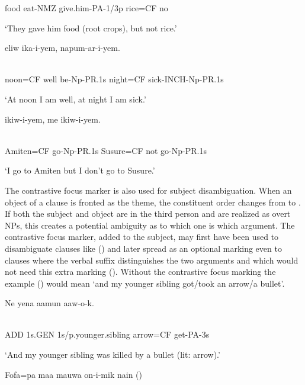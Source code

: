 food  eat-NMZ  give.him-PA-1/3p  rice=CF  no

`They gave him food (root crops), but not rice.'

\ea%
\label{ex:x1693}
\gll {}  eliw  ika-i-yem,    napum-ar-i-yem. \\
      \\
\glt
\z

noon=CF  well  be-Np-PR.1s  night=CF  sick-INCH-Np-PR.1s

`At noon I am well, at night I am sick.'

\ea%
\label{ex:x1694}
\gll {}  ikiw-i-yem,    me  ikiw-i-yem. \\
      \\
\glt
\z

Amiten=CF  go-Np-PR.1s  Susure=CF  not  go-Np-PR.1s

`I go to Amiten but I don't go to Susure.'

The contrastive focus marker is also used for subject disambiguation. When an object of a clause is fronted as the theme, the constituent order changes from  to . If both the subject and object are in the third person and are realized as overt NPs, this creates a potential ambiguity as to which one is which argument. The contrastive focus marker, added to the subject, may first have been used to disambiguate clauses like () and later spread as an optional marking even to clauses where the verbal suffix distinguishes the two arguments and which would not need this extra marking (). Without the contrastive focus marking the example () would mean `and my younger sibling got/took an arrow/a bullet'.

\ea%
\label{ex:x1695}
\gll Ne  yena  aamun    aaw-o-k. \\
      \\
\glt
\z

ADD  1s.GEN  1s/p.younger.sibling  arrow=CF  get-PA-3s

`And my younger sibling was killed by a bullet (lit: arrow).'

\ea%
\label{ex:x1696}
\gll Fofa=pa  maa  mauwa  on-i-mik  nain  ()  \\
      \\
\glt
\z

